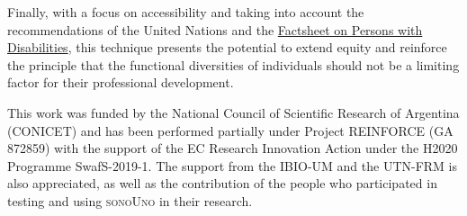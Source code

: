 \documentclass[baaa]{baaa}
\begin{document}
Finally, with a focus on accessibility and taking into account the recommendations of the United Nations and the \href{https://www.un.org/development/desa/disabilities/resources/factsheet-on-persons-with-disabilities.html}{Factsheet on Persons with Disabilities}, this technique presents the potential to extend equity and reinforce the principle that the functional diversities of individuals should not be a limiting factor for their professional development.

\begin{acknowledgement}

This work was funded by the National Council of Scientific Research of Argentina (CONICET) and has been performed partially under Project REINFORCE (GA 872859) with the support of the EC Research Innovation Action under the H2020 Programme SwafS-2019-1.
The support from the IBIO-UM and the UTN-FRM is also appreciated, as well as the contribution of the people who participated in testing and using \textsc{sonoUno} in their research.  

\end{acknowledgement}



\small

 
\end{document}
